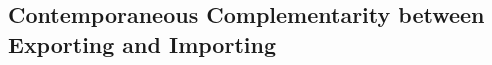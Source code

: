 \documentclass[12pt]{article}
\begin{document}

  
% 
% 

 \newpage
\subsection{Contemporaneous Complementarity between Exporting and Importing}\label{sec:biprobit}
\end{document}

